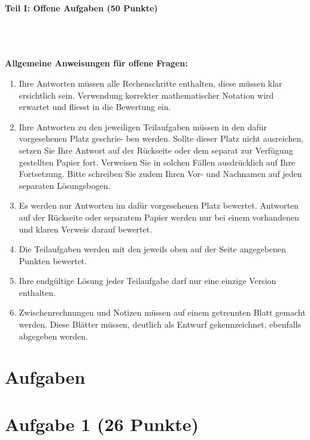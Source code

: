 

\begin{Large}
\textbf{Teil I: Offene Aufgaben (50 Punkte)}
\end{Large}
\\
\\
\\
\textbf{Allgemeine Anweisungen für offene Fragen:}
\\
\renewcommand{\labelenumi}{(\roman{enumi})}
\begin{enumerate}
\item
Ihre Antworten müssen alle Rechenschritte enthalten,
diese müssen klar ersichtlich sein.
Verwendung korrekter mathematischer Notation wird erwartet
und fliesst in die Bewertung ein.

\item
Ihre Antworten zu den jeweiligen Teilaufgaben müssen in den dafür vorgesehenen Platz geschrie-
ben werden. Sollte dieser Platz nicht ausreichen, setzen Sie Ihre Antwort auf der Rückseite oder
dem separat zur Verfügung gestellten Papier fort. Verweisen Sie in solchen Fällen ausdrücklich
auf Ihre Fortsetzung. Bitte schreiben Sie zudem Ihren Vor- und Nachnamen auf jeden separaten
Lösungsbogen.

\item
Es werden nur Antworten im dafür vorgesehenen Platz bewertet. Antworten auf der Rückseite
oder separatem Papier werden nur bei einem vorhandenen und klaren Verweis darauf bewertet.

\item
Die Teilaufgaben werden mit den jeweils oben auf der Seite angegebenen Punkten bewertet.

\item
Ihre endgültige Lösung jeder Teilaufgabe darf nur eine einzige Version enthalten.

\item
Zwischenrechnungen und Notizen müssen auf einem getrennten Blatt gemacht werden. Diese
Blätter müssen, deutlich als Entwurf gekennzeichnet, ebenfalls abgegeben werden.
\end{enumerate}

\newpage
\section*{\hfil Aufgaben \hfil}
\vspace{1cm}
\section*{Aufgabe 1 (26 Punkte)}
\vspace{0.4cm}
